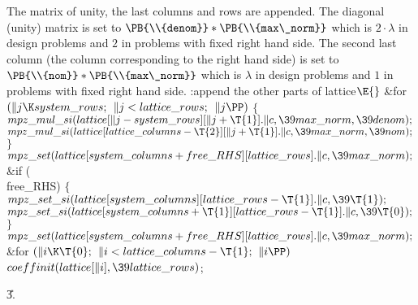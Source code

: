 The matrix of unity, the last columns and rows are appended.
The diagonal (unity) matrix is set to
$\PB{\\{denom}}*\PB{\\{max\_norm}}$ which is $2\cdot\lambda$ in design problems
and $2$ in problems with fixed right hand side.
The second last column (the column corresponding to the right hand side)
is set to
$\PB{\\{nom}}*\PB{\\{max\_norm}}$ which is $\lambda$ in design problems
and $1$ in problems with fixed right hand side.
\Y\B\4:append the other parts of lattice\X${}\E{}$\6
\&{for} ${}(\|j\K\\{system\_rows};{}$ ${}\|j<\\{lattice\_rows};{}$ ${}\|j%
\PP){}$\5
${}\{{}$\1\6
${}\\{mpz\_mul\_si}(\\{lattice}[\|j-\\{system\_rows}][\|j+\T{1}].\|c,\39\\{max%
\_norm},\39\\{denom});{}$\6
${}\\{mpz\_mul\_si}(\\{lattice}[\\{lattice\_columns}-\T{2}][\|j+\T{1}].\|c,\39%
\\{max\_norm},\39\\{nom});{}$\6
\4${}\}{}$\2\6
${}\\{mpz\_set}(\\{lattice}[\\{system\_columns}+\\{free\_RHS}][\\{lattice%
\_rows}].\|c,\39\\{max\_norm});{}$\6
\&{if} (\\{free\_RHS})\5
${}\{{}$\1\6
${}\\{mpz\_set\_si}(\\{lattice}[\\{system\_columns}][\\{lattice\_rows}-\T{1}].%
\|c,\39\T{1});{}$\6
${}\\{mpz\_set\_si}(\\{lattice}[\\{system\_columns}+\T{1}][\\{lattice\_rows}-%
\T{1}].\|c,\39\T{0});{}$\6
\4${}\}{}$\2\6
${}\\{mpz\_set}(\\{lattice}[\\{system\_columns}+\\{free\_RHS}][\\{lattice%
\_rows}].\|c,\39\\{max\_norm});{}$\6
\&{for} ${}(\|i\K\T{0};{}$ ${}\|i<\\{lattice\_columns}-\T{1};{}$ ${}\|i\PP){}$%
\1\5
${}\\{coeffinit}(\\{lattice}[\|i],\39\\{lattice\_rows}){}$;\2\par
\U3.\fi

